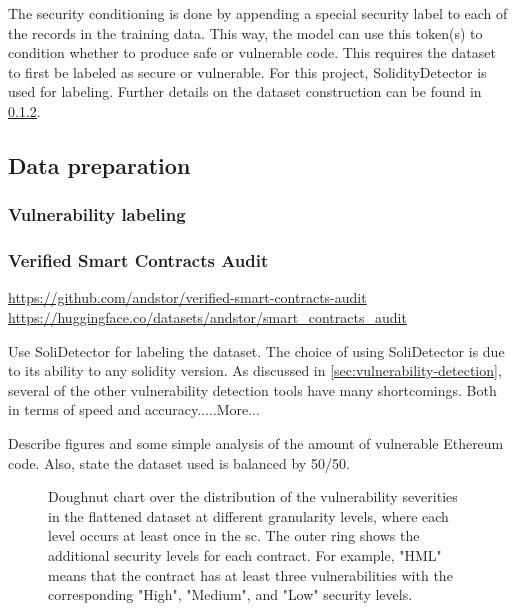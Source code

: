 The security conditioning is done by appending a special security label to each of the records in the training data. This way, the model can use this token(s) to condition whether to produce safe or vulnerable code. This requires the dataset to first be labeled as secure or vulnerable. For this project, SolidityDetector is used for labeling. Further details on the dataset construction can be found in \cref{sec:verified-smart-contracts-audit}.





\subsection{Data preparation}
\label{sec:data-preparation}

\subsubsection{Vulnerability labeling}
\label{sec:vulnerability-labeling}

\subsubsection{Verified Smart Contracts Audit}
\label{sec:verified-smart-contracts-audit}

\url{https://github.com/andstor/verified-smart-contracts-audit}
\url{https://huggingface.co/datasets/andstor/smart_contracts_audit}


Use  SoliDetector for labeling the dataset. The choice of using SoliDetector is due to its ability to any solidity version. As discussed in \cref{sec:vulnerability-detection}, several of the other vulnerability detection tools have many shortcomings. Both in terms of speed and accuracy.....More...

Describe figures and some simple analysis of the amount of vulnerable Ethereum code. Also, state the dataset used is balanced by 50/50.

\begin{figure}[htbp]
    \centering
    
    \caption{Doughnut chart over the distribution of the vulnerability severities in the flattened dataset at different granularity levels, where each level occurs at least once in the \acrshort{sc}. The outer ring shows the additional security levels for each contract. For example, "HML" means that the contract has at least three vulnerabilities with the corresponding "High", "Medium", and "Low" security levels.}
\end{figure}


